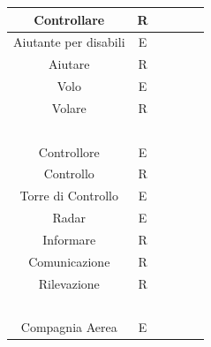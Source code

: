 \begin{tabular}{ | c  c  c | c  c  c | }
	\hline
	\textsf{\small Controllare} & \textsf{\small R} & \textsf{\small $ $} & \textsf{\small } & \textsf{\small } & \textsf{\small $ $}\\
	\hline
	\textsf{\small Aiutante per disabili} & \textsf{\small E} & \textsf{\small $ $} & \textsf{\small } & \textsf{\small } & \textsf{\small $ $}\\
	\hline
	\textsf{\small Aiutare} & \textsf{\small R} & \textsf{\small $ $} & \textsf{\small } & \textsf{\small } & \textsf{\small $ $}\\
	\hline
	\textsf{\small Volo} & \textsf{\small E} & \textsf{\small $ $} & \textsf{\small } & \textsf{\small } & \textsf{\small $ $}\\
	\hline
	\textsf{\small Volare} & \textsf{\small R} & \textsf{\small $ $} & \textsf{\small } & \textsf{\small } & \textsf{\small $ $}\\
	\hline
	\textsf{\small } & \textsf{\small } & \textsf{\small $ $} & \textsf{\small } & \textsf{\small } & \textsf{\small $ $} \\
	\hline
	\textsf{\small Controllore} & \textsf{\small E} & \textsf{\small $ $} & \textsf{\small } & \textsf{\small } & \textsf{\small $ $}\\
	\hline
	\textsf{\small Controllo} & \textsf{\small R} & \textsf{\small $ $} & \textsf{\small } & \textsf{\small } & \textsf{\small $ $}\\
	\hline
	\textsf{\small Torre di Controllo} & \textsf{\small E} & \textsf{\small $ $} & \textsf{\small } & \textsf{\small } & \textsf{\small $ $}\\
	\hline
	\textsf{\small Radar} & \textsf{\small E} & \textsf{\small $ $} & \textsf{\small } & \textsf{\small } & \textsf{\small $ $}\\
	\hline
	\textsf{\small Informare} & \textsf{\small R} & \textsf{\small $ $} & \textsf{\small } & \textsf{\small } & \textsf{\small $ $}\\
	\hline
	\textsf{\small Comunicazione} & \textsf{\small R} & \textsf{\small $ $} & \textsf{\small } & \textsf{\small } & \textsf{\small $ $}\\
	\hline
	\textsf{\small Rilevazione} & \textsf{\small R} & \textsf{\small $ $} & \textsf{\small } & \textsf{\small } & \textsf{\small $ $}\\
	\hline
	\textsf{\small } & \textsf{\small } & \textsf{\small $ $} & \textsf{\small } & \textsf{\small } & \textsf{\small $ $}\\
	\hline
	\textsf{\small Compagnia Aerea} & \textsf{\small E} & \textsf{\small $ $} & \textsf{\small } & \textsf{\small } & \textsf{\small $ $}\\

\end{tabular}
